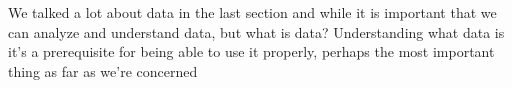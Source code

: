 We talked a lot about data in the last section and while it is important that we can analyze and understand data, but what is data?
Understanding what data is it's a prerequisite for being able to use it properly, perhaps the most important thing as far as we're concerned